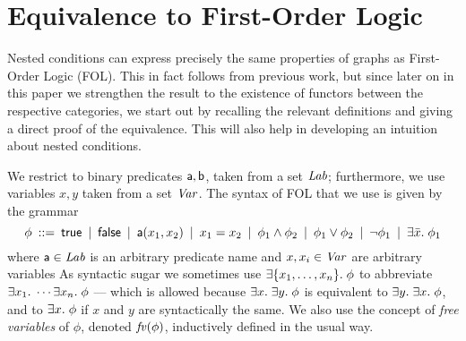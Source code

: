 \section{Equivalence to First-Order Logic}

Nested conditions can express precisely the same properties of graphs as First-Order Logic (FOL). This in fact follows from previous work, but since later on in this paper we strengthen the result to the existence of functors between the respective categories, we start out by recalling the relevant definitions and giving a direct proof of the equivalence. This will also help in developing an intuition about nested conditions.

We restrict to binary predicates $\mathsf{a},\mathsf{b}$, taken from a set $\mathit{Lab}$; furthermore, we use variables $x,y$ taken from a set $\mathit{Var}$. The syntax of FOL that we use is given by the grammar
%
\[ \phi \:::=\: \mathsf{true}
        \:\mid\: \mathsf{false}
		\:\mid\: \mathsf{a}(x_1,x_2)
        \:\mid\: x_1=x_2
		\:\mid\: \phi_1\wedge \phi_2
		\:\mid\: \phi_1\vee \phi_2
		\:\mid\: \neg\phi_1
		\:\mid\: \exists \bar x.\; \phi_1 
		\]
where $\mathsf{a}\in\mathit{Lab}$ is an arbitrary predicate name and $x,x_i\in\mathit{Var}$ are arbitrary variables As syntactic sugar we sometimes use $\exists \{{x_1,\ldots,x_n}\}.\; \phi$ to abbreviate $\exists x_1.\; \cdots \exists x_n.\; \phi$ --- which is allowed because $\exists x.\; \exists y.\; \phi$ is equivalent to $\exists y.\; \exists x.\; \phi$, and to $\exists x.\; \phi$ if $x$ and $y$ are syntactically the same. We also use the concept of \emph{free variables} of $\phi$, denoted $\mathit{fv}(\phi)$, inductively defined in the usual way.


